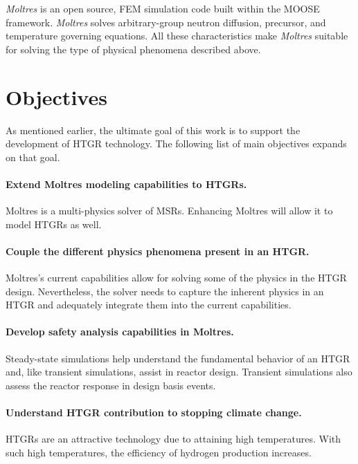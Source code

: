 \textit{Moltres} \cite{lindsay_introduction_2018} is an open source, \gls{FEM} simulation code built within the \gls{MOOSE} framework.
\textit{Moltres} solves arbitrary-group neutron diffusion, precursor, and temperature governing equations.
All these characteristics make \textit{Moltres} suitable for solving the type of physical phenomena described above.

\section{Objectives}

As mentioned earlier, the ultimate goal of this work is to support the development of \gls{HTGR} technology.
The following list of main objectives expands on that goal.

\paragraph{Extend Moltres modeling capabilities to \glspl{HTGR}.}
Moltres is a multi-physics solver of \glspl{MSR}.
Enhancing Moltres will allow it to model \glspl{HTGR} as well.

\paragraph{Couple the different physics phenomena present in an HTGR.}
Moltres's current capabilities allow for solving some of the physics in the HTGR design.
Nevertheless, the solver needs to capture the inherent physics in an HTGR and adequately integrate them into the current capabilities.

\paragraph{Develop safety analysis capabilities in Moltres.}
Steady-state simulations help understand the fundamental behavior of an HTGR and, like transient simulations, assist in reactor design. 
Transient simulations also assess the reactor response in design basis events.

\paragraph{Understand \gls{HTGR} contribution to stopping climate change.}
HTGRs are an attractive technology due to attaining high temperatures.
With such high temperatures, the efficiency of hydrogen production increases.

